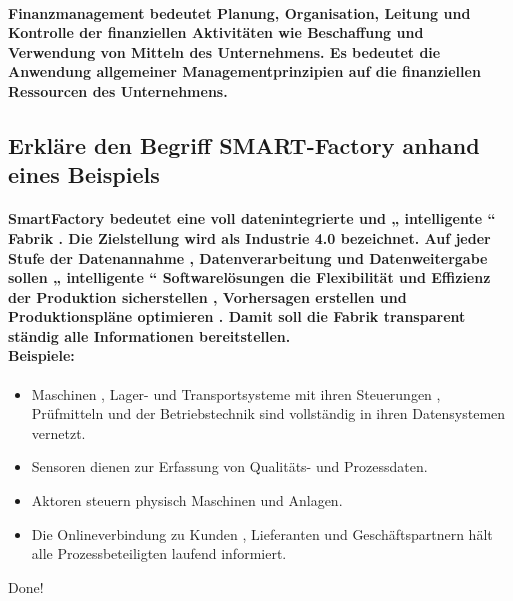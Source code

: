 \documentclass[a4paper]{article}
\begin{document}
    \paragraph{\color{codegreen}Finanzmanagement bedeutet Planung, Organisation, Leitung und Kontrolle der finanziellen Aktivitäten wie Beschaffung und Verwendung von Mitteln des Unternehmens. Es bedeutet die Anwendung allgemeiner Managementprinzipien auf die finanziellen Ressourcen des Unternehmens.}
    \subsection{\color{red} Erkläre den Begriff SMART-Factory anhand eines Beispiels}\label{subsec:erkläre-den-begriff-smart-factory-anhand-eines-beispiels}
    \paragraph{\color{codegreen}SmartFactory bedeutet eine voll datenintegrierte und „ intelligente “ Fabrik . Die Zielstellung wird als Industrie 4.0 bezeichnet. Auf jeder Stufe der Datenannahme , Datenverarbeitung und Datenweitergabe sollen „ intelligente “ Softwarelösungen die Flexibilität und Effizienz der Produktion sicherstellen , Vorhersagen erstellen und Produktionspläne optimieren . Damit soll die Fabrik transparent ständig alle Informationen bereitstellen.\\\color{red} Beispiele:}
    \begin{itemize}
        \color{magenta}
        \item Maschinen , Lager- und Transportsysteme mit ihren Steuerungen , Prüfmitteln und der Betriebstechnik sind vollständig in ihren Datensystemen vernetzt.
        \item Sensoren dienen zur Erfassung von Qualitäts- und Prozessdaten.
        \item Aktoren steuern physisch Maschinen und Anlagen.
        \item Die Onlineverbindung zu Kunden , Lieferanten und Geschäftspartnern hält alle Prozessbeteiligten laufend informiert.
    \end{itemize}
    \begin{center}
        \color{red}\Huge Done!
    \end{center}
\end{document}
